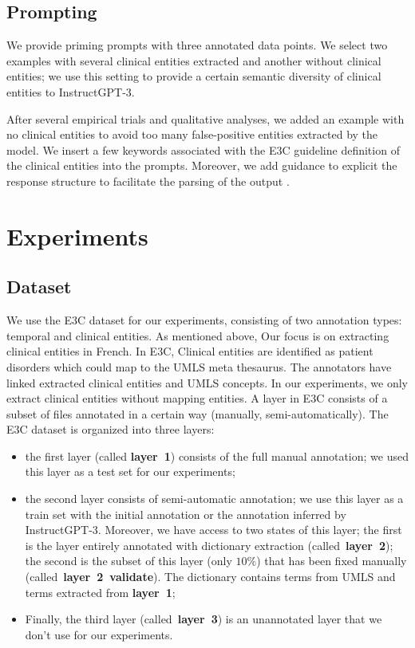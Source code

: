\subsection{Prompting}

We provide priming prompts with three annotated data points. We select two examples with several clinical entities extracted and another without clinical entities; we use this setting to provide a certain semantic diversity of clinical entities to InstructGPT-3.

After several empirical trials and qualitative analyses, we added an example with no clinical entities to avoid too many false-positive entities extracted by the model. We insert a few keywords associated with the E3C guideline definition of the clinical entities into the prompts. Moreover, we add guidance to explicit the response structure to facilitate the parsing of the output \citep{Agrawal2022LargeExtractors}.

\section{Experiments}
\subsection{Dataset}
We use the E3C dataset \citep{Magnini2020TheCases} for our experiments, consisting of two annotation types: temporal and clinical entities. As mentioned above, Our focus is on extracting clinical entities in French. In E3C, Clinical entities are identified as patient disorders which could map to the UMLS meta thesaurus. The annotators have linked extracted clinical entities and UMLS concepts. In our experiments, we only extract clinical entities without mapping entities.
A layer in E3C consists of a subset of files annotated in a certain way (manually, semi-automatically).
The E3C dataset is organized into three layers: 
\begin{itemize}
    \item the first layer (called \textbf{layer~1}) consists of the full manual annotation; we used this layer as a test set for our experiments;
    \item the second layer consists of semi-automatic annotation; we use this layer as a train set with the initial annotation or the annotation inferred by InstructGPT-3. Moreover, we have access to two states of this layer; the first is the layer entirely annotated with dictionary extraction (called~\textbf{layer~2}); the second is the subset of this layer (only $10\%$) that has been fixed manually (called~\textbf{layer~2~validate}). The dictionary contains terms from UMLS and terms extracted from \textbf{layer~1};
    \item Finally, the third layer (called~\textbf{layer~3}) is an unannotated layer that we don't use for our experiments.
\end{itemize}

